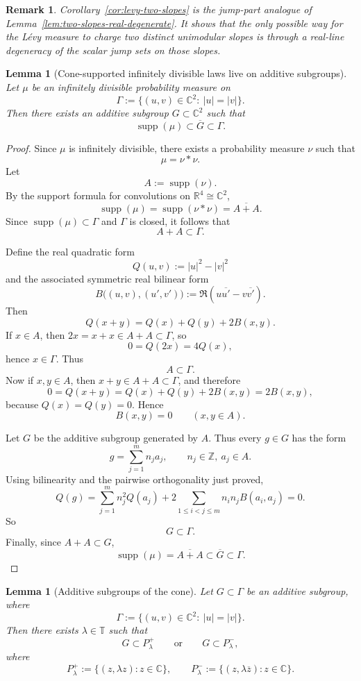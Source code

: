 \documentclass[11pt]{amsart}
\newtheorem{lemma}[theorem]{Lemma}
\newtheorem{remark}[theorem]{Remark}
\newcommand{\C}{\mathbb{C}}
\newcommand{\R}{\mathbb{R}}
\newcommand{\T}{\mathbb{T}}
\newcommand{\supp}{\operatorname{supp}}
\begin{document}
\begin{remark}
Corollary~\ref{cor:levy-two-slopes} is the jump-part analogue of
Lemma~\ref{lem:two-slopes-real-degenerate}.  It shows that the only possible
way for the L\'evy measure to charge two distinct unimodular slopes is through a
real-line degeneracy of the scalar jump sets on those slopes.
\end{remark}

\begin{lemma}[Cone-supported infinitely divisible laws live on additive subgroups]
\label{lem:id-cone-additive-subgroup}
Let $\mu$ be an infinitely divisible probability measure on
\[
  \Gamma:=\{(u,v)\in\C^2:\ |u|=|v|\}.
\]
Then there exists an additive subgroup $G\subset \C^2$ such that
\[
  \supp(\mu)\subset \overline{G}\subset \Gamma.
\]
\end{lemma}

\begin{proof}
Since $\mu$ is infinitely divisible, there exists a probability measure $\nu$
such that
\[
  \mu=\nu*\nu.
\]
Let
\[
  A:=\supp(\nu).
\]
By the support formula for convolutions on $\R^4\cong\C^2$,
\[
  \supp(\mu)=\supp(\nu*\nu)=\overline{A+A}.
\]
Since $\supp(\mu)\subset \Gamma$ and $\Gamma$ is closed, it follows that
\[
  A+A\subset \Gamma.
\]

Define the real quadratic form
\[
  Q(u,v):=|u|^2-|v|^2
\]
and the associated symmetric real bilinear form
\[
  B\bigl((u,v),(u',v')\bigr):=\Re(u\overline{u'}-v\overline{v'}).
\]
Then
\[
  Q(x+y)=Q(x)+Q(y)+2B(x,y).
\]
If $x\in A$, then $2x=x+x\in A+A\subset \Gamma$, so
\[
  0=Q(2x)=4Q(x),
\]
hence $x\in \Gamma$.  Thus
\[
  A\subset \Gamma.
\]
Now if $x,y\in A$, then $x+y\in A+A\subset \Gamma$, and therefore
\[
  0=Q(x+y)=Q(x)+Q(y)+2B(x,y)=2B(x,y),
\]
because $Q(x)=Q(y)=0$.  Hence
\[
  B(x,y)=0
  \qquad (x,y\in A).
\]

Let $G$ be the additive subgroup generated by $A$.  Thus every $g\in G$ has
the form
\[
  g=\sum_{j=1}^m n_j a_j,
  \qquad n_j\in\mathbb Z,\ a_j\in A.
\]
Using bilinearity and the pairwise orthogonality just proved,
\[
  Q(g)=\sum_{j=1}^m n_j^2 Q(a_j)+2\sum_{1\le i<j\le m} n_i n_j B(a_i,a_j)=0.
\]
So
\[
  G\subset \Gamma.
\]
Finally, since $A+A\subset G$,
\[
  \supp(\mu)=\overline{A+A}\subset \overline{G}\subset \Gamma.
\]
\end{proof}

\begin{lemma}[Additive subgroups of the cone]
\label{lem:additive-subgroups-cone}
Let $G\subset \Gamma$ be an additive subgroup, where
\[
  \Gamma:=\{(u,v)\in\C^2:\ |u|=|v|\}.
\]
Then there exists $\lambda\in\T$ such that
\[
  G\subset P_\lambda^+
  \qquad\text{or}\qquad
  G\subset P_\lambda^-,
\]
where
\[
  P_\lambda^+:=\{(z,\lambda z): z\in\C\},
  \qquad
  P_\lambda^-:=\{(z,\lambda \overline z): z\in\C\}.
\]
\end{lemma}
\end{document}
